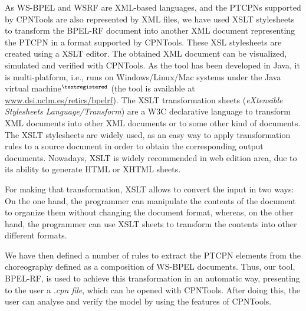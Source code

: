 As WS-BPEL and WSRF are XML-based languages, and the PTCPNs supported by CPNTools are also represented by XML files, we have used XSLT stylesheets to transform the BPEL-RF document into another XML document representing the PTCPN in a format supported by CPNTools. These XSL stylesheets are created using a XSLT editor. The obtained XML document can be visualized, simulated and verified with CPNTools. As the tool has been developed in Java, it is multi-platform, i.e., runs on Windows/Linux/Mac systems under the Java virtual machine$^{\textregistered}$ (the tool is available at \url{www.dsi.uclm.es/retics/bpelrf}).
The XSLT transformation sheets (\textsl{eXtensible Stylesheets Language/Transform}) are a W3C declarative language to transform XML documents into other XML documents or to some other kind of documents. The XSLT stylesheets are widely used, as an easy way to apply transformation rules to a source document in order to obtain the corresponding output documents. Nowadays, XSLT is widely recommended in web edition area, due to its ability to generate HTML or XHTML sheets.

For making that transformation, XSLT allows to convert the input in two ways: On the one hand, the programmer can manipulate the contents of the document to organize them without changing the document format, whereas, on the other hand, the programmer can use XSLT sheets to transform the contents into other  different formats.


We have then defined a number of rules to extract the PTCPN elements from the choreography defined as a composition of WS-BPEL documents. Thus, our tool, BPEL-RF, is used to achieve this transformation in an automatic way, presenting to the user a \textit{.cpn file}, which can be opened with CPNTools. After doing this, the user can analyse and verify the model by using the features of CPNTools. 
        

